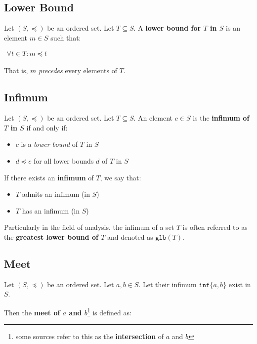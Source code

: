 \subsection{Lower Bound}
\label{sec:lower-bound}

Let $(S, \preceq)$ be an ordered set. Let $T \subseteq S$. A
\textbf{lower bound for $T$ in $S$} is an element $m \in S$ such that:

\begin{math}
  \begin{array}{c}
    \forall t \in T: m \preceq t
  \end{array}
\end{math}

That is, $m$ \textit{precedes} every elements of $T$.


\subsection{Infimum}
\label{sec:infimum}

Let $(S, \preceq)$ be an ordered set. Let $T \subseteq S$. An element
$c \in S$ is the \textbf{infimum of $T$ in $S$} if and only if:

\begin{itemize}
\item $c$ is a \textit{lower bound} of $T$ in $S$
\item $d \preceq c$ for all lower bounds $d$ of $T$ in $S$
\end{itemize}

If there exists an \textbf{infimum} of $T$, we say that:

\begin{itemize}
\item $T$ admits an infimum (in $S$)
\item $T$ has an infimum (in $S$)
\end{itemize}


Particularly in the field of analysis, the infimum of a set $T$ is
often referred to as the \textbf{greatest lower bound of $T$} and
denoted as $\mathtt{glb}(T)$.


\subsection{Meet}
\label{sec:meet}

Let $(S, \preceq)$ be an ordered set. Let $a, b \in S$. Let their
infimum $\mathtt{inf} \{a, b\}$ exist in $S$.

Then the \textbf{meet of $a$ and $b$}\footnote{some sources refer to
  this as the \textbf{intersection} of $a$ and $b$} is defined as:

